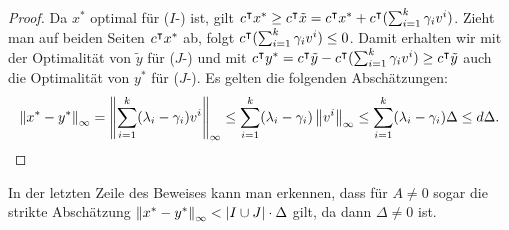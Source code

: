 \begin{proof}
	Da $x^*$ optimal für ($I$-\MIPR) ist, gilt $c^\intercal x^*\geq c^\intercal \tilde{x} = c^\intercal x^* + c^\intercal (\sum_{i=1}^k\gamma_iv^i)$.
	Zieht man auf beiden Seiten $c^\intercal x^*$ ab, folgt $c^\intercal(\sum_{i=1}^k\gamma_iv^i)\leq0$.
	Damit erhalten wir mit der Optimalität von $\tilde{y}$ für ($J$-\MIPR) und mit 
	$c^\intercal y^*=c^\intercal\tilde{y}-c^\intercal(\sum_{i=1}^k\gamma_iv^i)\geq c^\intercal\tilde{y}$
	auch die Optimalität von $y^*$ für ($J$-\MIPR).
	Es gelten die folgenden Abschätzungen:
	$$\left\lVert x^*-y^*\right\rVert_\infty=\left\lVert\sum_{i=1}^k(\lambda_i-\gamma_i)v^i\right\rVert_\infty\leq \sum_{i=1}^k(\lambda_i-\gamma_i)\left\lVert v^i\right\rVert_\infty\leq \sum_{i=1}^k(\lambda_i-\gamma_i)\Delta\leq d\Delta.
	$$
\end{proof}
\begin{remark}
	In der letzten Zeile des Beweises kann man erkennen, dass für $A\neq 0$ sogar die strikte Abschätzung $\left\lVert x^*-y^*\right\rVert_\infty<\lvert I\cup J \rvert\cdot\Delta$ gilt, da dann $\Delta\neq 0$ ist.
\end{remark}
